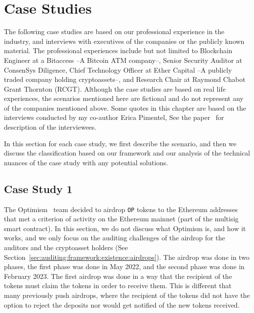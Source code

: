 


\section{Case Studies} \label{sec:auditing:case-studies}

The following case studies are based on our professional experience in the industry, and interviews with executives of the companies or the publicly known material. The professional experiences include but not limited to Blockchain Engineer at a Bitaccess --A Bitcoin ATM company--, Senior Security Auditor at ConsenSys Diligence, Chief Technology Officer at Ether Capital --A publicly traded company holding cryptoassets--, and Research Chair at Raymond Chabot Grant Thornton (RCGT). Although the case studies are based on real life experiences, the scenarios mentioned here are fictional and do not represent any of the companies mentioned above. Some quotes in this chapter are based on the interviews conducted by my co-author Erica Pimentel, See the paper~\cite{pimentel2021systemizing} for description of the interviewees.

In this section for each case study, we first describe the scenario, and then we discuss the classification based on our framework and our analysis of the technical nuances of the case study with any potential solutions.


\subsection{Case Study 1} \label{sec:auditing:case-studies:existence} %
The Optimism~\cite{optimismgithub} team decided to airdrop \texttt{OP} tokens to the Ethereum addresses that met a criterion of activity on the Ethereum mainnet (\eg part of the multisig smart contract). In this section, we do not discuss what Optimism is, and how it works, and we only focus on the auditing challenges of the airdrop for the auditors and the cryptoasset holders (See Section~\ref{sec:auditing:framework:existence:airdrops}). The airdrop was done in two phases, the first phase was done in May 2022, and the second phase was done in February 2023. The first airdrop was done in a way that the recipient of the tokens must claim the tokens in order to receive them. This is different that many previously push airdrops, where the recipient of the tokens did not have the option to reject the deposits nor would get notified of the new tokens received. 


